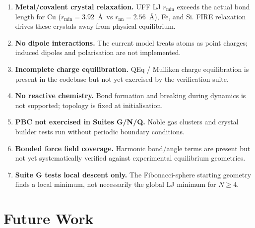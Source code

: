 \documentclass[11pt,twoside]{article}
\newcommand{\rmin}{r_{\mathrm{min}}}
\begin{document}
\begin{enumerate}
  \item \textbf{Metal/covalent crystal relaxation.}  UFF LJ $\rmin$ exceeds
        the actual bond length for Cu ($\rmin = 3.92$~\AA\ vs
        $r_{\mathrm{nn}} = 2.56$~\AA), Fe, and Si.  FIRE relaxation drives
        these crystals away from physical equilibrium.
  \item \textbf{No dipole interactions.}  The current model treats atoms as
        point charges; induced dipoles and polarisation are not implemented.
  \item \textbf{Incomplete charge equilibration.}  QEq / Mulliken charge
        equilibration is present in the codebase but not yet exercised by
        the verification suite.
  \item \textbf{No reactive chemistry.}  Bond formation and breaking during
        dynamics is not supported; topology is fixed at initialisation.
  \item \textbf{PBC not exercised in Suites G/N/Q.}  Noble gas clusters and
        crystal builder tests run without periodic boundary conditions.
  \item \textbf{Bonded force field coverage.}  Harmonic bond/angle terms are
        present but not yet systematically verified against experimental
        equilibrium geometries.
  \item \textbf{Suite G tests local descent only.}  The Fibonacci-sphere
        starting geometry finds a local minimum, not necessarily the global
        LJ minimum for $N \geq 4$.
\end{enumerate}


\section{Future Work}
\label{sec:future}
\end{document}
